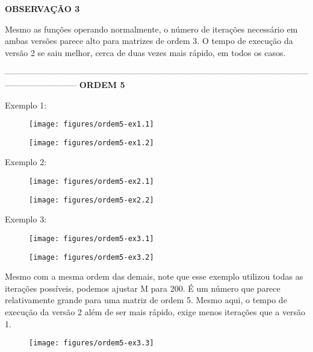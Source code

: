 \documentclass[leqno]{article}
\numberwithin{equation}{section}
\begin{document}
\begin{enumerate}
		\textbf{{\normalsize OBSERVAÇÃO 3}}
		
		Mesmo as funções operando normalmente, o número de iterações necessário em ambas versões parece alto para matrizes de ordem 3. O tempo de execução da versão 2 se saiu melhor, cerca de duas vezes mais rápido, em todos os casos.
		
		--------------------------------------------------------------------------------------------------------------------------------------
		\textbf{{\large ORDEM 5}}
		
		Exemplo 1:
		
		\begin{figure}[H]
			\centering
			\texttt{[image: figures/ordem5-ex1.1]}
		\end{figure}
		
		\begin{figure}[H]
			\centering
			\texttt{[image: figures/ordem5-ex1.2]}
		\end{figure}
	
	
		Exemplo 2:
		
		\begin{figure}[H]
			\centering
			\texttt{[image: figures/ordem5-ex2.1]}
		\end{figure}
		
		\begin{figure}[H]
			\centering
			\texttt{[image: figures/ordem5-ex2.2]}
		\end{figure}
		
		Exemplo 3:
		
		\begin{figure}[H]
			\centering
			\texttt{[image: figures/ordem5-ex3.1]}
		\end{figure}
		
		\begin{figure}[H]
			\centering
			\texttt{[image: figures/ordem5-ex3.2]}
		\end{figure}
	
		Mesmo com a mesma ordem das demais, note que esse exemplo utilizou todas as iterações possíveis, podemos ajustar M para 200.
		É um número que parece relativamente grande para uma matriz de ordem 5. Mesmo aqui, o tempo de execução da versão 2 além de ser mais rápido, exige menos iterações que a versão 1.
		
		\begin{figure}[H]
			\centering
			\texttt{[image: figures/ordem5-ex3.3]}
		\end{figure}
		

\end{enumerate}
\end{document}
